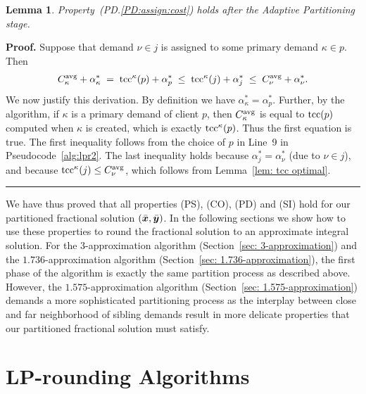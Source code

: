 \documentclass[oneside,final]{ucr}
\newtheorem{lemma}[theorem]{Lemma}
\newenvironment{proof}[1][Proof]{\textbf{#1.} }{\ \rule{0.5em}{0.5em}}
\begin{document}

\begin{lemma}\label{lem: PD:assign:cost holds}
Property~(PD.\ref{PD:assign:cost}) holds after the Adaptive Partitioning stage.
\end{lemma}
\begin{proof}
Suppose that demand $\nu\in j$ is assigned to some primary demand $\kappa\in p$.
Then
%
\begin{eqnarray*}
 C^{{\mbox{\scriptsize\rm avg}}}_{\kappa} + \alpha_{\kappa}^\ast \;=\; \mbox{\rm{tcc}}^{\kappa}(p) + \alpha^\ast_p
 					\;\le\; \mbox{\rm{tcc}}^{\kappa}(j) + \alpha^\ast_j   
					\;\le\; C^{{\mbox{\scriptsize\rm avg}}}_{\nu} + \alpha^\ast_\nu.
\end{eqnarray*}
%
We now justify this derivation. By definition we have
$\alpha_{\kappa}^\ast = \alpha^\ast_p$.  Further, by the
algorithm, if $\kappa$ is a primary demand of client $p$,
then $C^{{\mbox{\scriptsize\rm avg}}}_{\kappa}$ is equal to $\mbox{\rm{tcc}}(p)$ computed when
$\kappa$ is created, which is exactly $\mbox{\rm{tcc}}^{\kappa}(p)$. Thus
the first equation is true. The first inequality follows
from the choice of $p$ in Line~9 in
Pseudocode~\ref{alg:lpr2}. The last inequality holds
because $\alpha^\ast_j = \alpha^\ast_\nu$ (due to $\nu\in
j$), and because $\mbox{\rm{tcc}}^{\kappa}(j) \le C^{{\mbox{\scriptsize\rm avg}}}_{\nu}$, which
follows from Lemma~\ref{lem: tcc optimal}.
\end{proof}

We have thus proved that all properties (PS), (CO), (PD) and (SI) hold
for our partitioned fractional solution $(\bar{\boldsymbol{x}},\bar{\boldsymbol{y}})$. In the
following sections we show how to use these properties to round the
fractional solution to an approximate integral solution. For the
$3$-approximation algorithm (Section~\ref{sec: 3-approximation}) and
the $1.736$-approximation algorithm (Section~\ref{sec:
  1.736-approximation}), the first phase of the algorithm is exactly
the same partition process as described above. However, the
$1.575$-approximation algorithm (Section~\ref{sec:
  1.575-approximation}) demands a more sophisticated partitioning
process as the interplay between close and far neighborhood of sibling
demands result in more delicate properties that our partitioned
fractional solution must satisfy.

\chapter{LP-rounding Algorithms} \label{ch: lp-rounding}
\end{document}
